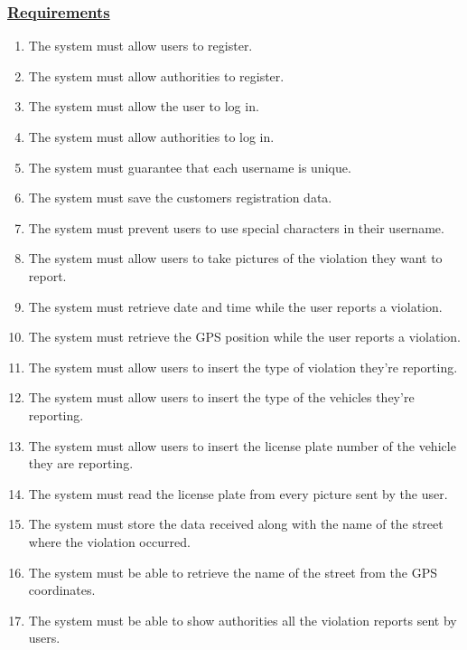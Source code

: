 	\subsubsection[Requirements]{\hyperlink{toc}{Requirements}}
		\begin{enumerate}[label=\textbf{R\arabic*}]
			\item \label{req:userReg} The system must allow users to register.
			\item \label{req:authorityReg} The system must allow authorities to register.
			\item \label{req:userLogin} The system must allow the user to log in.
			\item \label{req:authorityLogin} The system must allow authorities to log in.
			\item \label{req:uniqueName} The system must guarantee that each username is unique.
			\item \label{req:saveRegData} The system must save the customers registration data.
			\item \label{req:specialCharacters} The system must prevent users to use special characters in their username.
			\item \label{req:takePictures} The system must allow users to take pictures of the violation they want to report.
			\item \label{req:dateTime} The system must retrieve date and time while the user reports a violation.
			\item \label{req:gpsPosition} The system must retrieve the GPS position while the user reports a violation.
			\item \label{req:violationType} The system must allow users to insert the type of violation they’re reporting.
			\item \label{req:vehicleType} The system must allow users to insert the type of the vehicles they’re reporting.
			\item \label{req:plateNumber} The system must allow users to insert the license plate number of the vehicle they are reporting.
			\item \label{req:readPlate} The system must read the license plate from every picture sent by the user.
			\item \label{req:storeViolation} The system must store the data received along with the name of the street where the violation occurred.
			\item \label{req:streetName} The system must be able to retrieve the name of the street from the GPS coordinates.
			\item \label{req:notifyAuthority} The system must be able to show authorities all the violation reports sent by users.

\end{enumerate}
